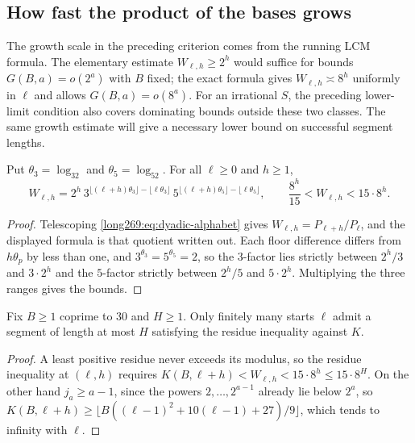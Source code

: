 \documentclass[11pt]{article}
\theoremstyle{remark}
\theoremstyle{plain}
\begin{document}
\subsection{How fast the product of the bases grows}

The growth scale in the preceding criterion comes from the running
LCM formula. The elementary estimate $W_{\ell,h}\ge2^h$ would suffice
for bounds $G(B,a)=o(2^a)$ with $B$ fixed; the exact formula gives
$W_{\ell,h}\asymp8^h$ uniformly in $\ell$ and allows $G(B,a)=o(8^a)$.
For an irrational $S$, the preceding lower-limit condition also covers
dominating bounds outside these two classes. The same growth estimate
will give a necessary lower bound on successful segment lengths.

\begin{proposition}\label{long269:res:window-growth}
Put $\theta_3=\log_32$ and $\theta_5=\log_52$.  For all $\ell\ge0$ and
$h\ge1$,
\[
 W_{\ell,h}=2^{h}\,
 3^{\lfloor(\ell+h)\theta_3\rfloor-\lfloor\ell\theta_3\rfloor}\,
 5^{\lfloor(\ell+h)\theta_5\rfloor-\lfloor\ell\theta_5\rfloor},
 \qquad
 \frac{8^{h}}{15}<W_{\ell,h}<15\cdot8^{h} .
\]
\end{proposition}

\begin{proof}
Telescoping \eqref{long269:eq:dyadic-alphabet} gives
$W_{\ell,h}=P_{\ell+h}/P_\ell$, and the displayed formula is that
quotient written out.  Each floor difference differs from $h\theta_p$ by less
than one, and $3^{\theta_3}=5^{\theta_5}=2$, so the $3$-factor lies strictly
between $2^{h}/3$ and $3\cdot2^{h}$ and the $5$-factor strictly between
$2^{h}/5$ and $5\cdot2^{h}$.  Multiplying the three ranges gives the bounds.
\end{proof}

\begin{corollary}\label{long269:res:no-bounded-length}
Fix $B\ge1$ coprime to $30$ and $H\ge1$.  Only finitely many starts $\ell$
admit a segment of length at most $H$ satisfying the residue inequality against $K$.
\end{corollary}

\begin{proof}
A least positive residue never exceeds its modulus, so the residue inequality at $(\ell,h)$
requires $K(B,\ell+h)<W_{\ell,h}<15\cdot8^{h}\le15\cdot8^{H}$.  On the other
hand $j_a\ge a-1$, since the powers $2,\ldots,2^{a-1}$ already lie below
$2^{a}$, so $K(B,\ell+h)\ge\lfloor B((\ell-1)^{2}+10(\ell-1)+27)/9\rfloor$,
which tends to infinity with $\ell$.
\end{proof}
\end{document}

